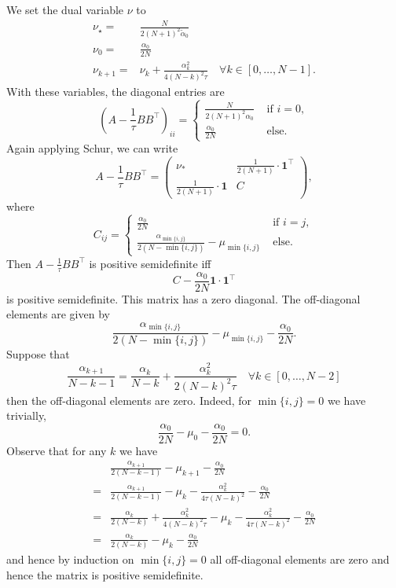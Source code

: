 \documentclass{article}
\begin{document}
\begin{appendixproof}
We set the dual variable $\nu$ to
\begin{align*}
  \nu_\star = & \frac{N}{2(N+1)^2 \tilde \alpha_0}\\
  \nu_0 = & \frac{\alpha_0}{2N}\\
  \nu_{k+1} = & \nu_{k} + \frac{\alpha_{k}^2}{4 (N-k)^2 \tau} \quad \forall k \in [0, \dots, N-1].
\end{align*}
With these variables, the diagonal entries are 
\[
\left(A-\frac1\tau BB^\top\right)_{ii}=\begin{cases}
    \frac{N}{2(N+1)^2 \alpha_0}&\text{ if }i=0,\\
    \frac{\alpha_0}{2N}&\text{ else.}
\end{cases}
\]
Again applying Schur, we can write
\[
A-\frac1\tau B B^\top=\left(\begin{array}{cc}
    \nu_* & \frac{1}{2(N+1)}\cdot \mathbf{1}^\top \\
    \frac{1}{2(N+1)}\cdot \mathbf{1} & C
\end{array}\right),
\]
where 
\[
C_{ij}=\begin{cases}
    \frac{\alpha_0}{2N}&\text{ if }i=j,\\
    \frac{\alpha_{\min\{i,j\}}}{2(N-\min\{i,j\})}-\mu_{\min\{i,j\}}&\text{ else.}
\end{cases}
\]
Then $A-\frac1\tau BB^\top$ is positive semidefinite iff
\[
C-\frac{\alpha_0}{2N}\mathbf{1}\cdot\mathbf{1}^\top
\]
is positive semidefinite. This matrix has a zero diagonal. The off-diagonal elements are given by
\[
\frac{\alpha_{\min\{i,j\}}}{2(N-\min\{i,j\})}-\mu_{\min\{i,j\}}-\frac{\alpha_0}{2N}.
\]
Suppose that
\[
  \frac{\alpha_{k+1}}{N-k-1} = \frac{\alpha_{k}}{N-k} + \frac{\alpha^2_{k}}{2 (N-k)^2 \tau} \quad \forall k\in [0, \dots, N-2]
\]
then the off-diagonal elements are zero. Indeed, for $\min\{i,j\}=0$ we have trivially,
\[
    \frac{\alpha_{0}}{2N}-\mu_{0}-\frac{\alpha_0}{2N}=0.
\]
Observe that for any $k$ we have
\begin{align*}
& \frac{\alpha_{k+1}}{2(N-k-1)}-\mu_{k+1}-\frac{\alpha_0}{2N}\\
= & \frac{\alpha_{k+1}}{2(N-k-1)}-\mu_{k}-\frac{\alpha_k^2}{4\tau(N-k)^2}-\frac{\alpha_0}{2N}\\
= & \frac{\alpha_{k}}{2(N-k)} + \frac{\alpha^2_{k}}{4 (N-k)^2 \tau} -\mu_{k}-\frac{\alpha_k^2}{4\tau(N-k)^2}-\frac{\alpha_0}{2N}\\
= & \frac{\alpha_{k}}{2(N-k)} -\mu_{k}-\frac{\alpha_0}{2N}
\end{align*}
and hence by induction on $\min\{i,j\}=0$ all off-diagonal elements are zero and hence the matrix is positive semidefinite.

\end{appendixproof}
\end{document}
